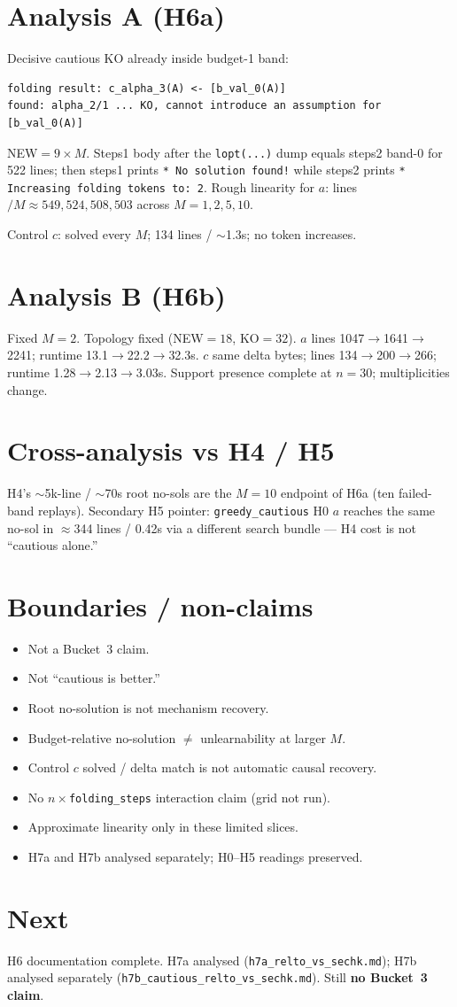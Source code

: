 \documentclass[11pt]{article}
\begin{document}
\section{Analysis A (H6a)}

Decisive cautious KO already inside budget-1 band:
\begin{verbatim}
folding result: c_alpha_3(A) <- [b_val_0(A)]
found: alpha_2/1 ... KO, cannot introduce an assumption for [b_val_0(A)]
\end{verbatim}
NEW${=}9\times M$.
Steps1 body after the \texttt{lopt(...)} dump equals steps2 band-0 for 522
lines; then steps1 prints \texttt{* No solution found!} while steps2 prints
\texttt{* Increasing folding tokens to: 2}.
Rough linearity for $a$: lines$/M\approx 549,524,508,503$ across $M{=}1,2,5,10$.

Control $c$: solved every $M$; 134 lines / $\sim$1.3s; no token increases.

\section{Analysis B (H6b)}

Fixed $M{=}2$. Topology fixed (NEW${=}18$, KO${=}32$).
$a$ lines 1047$\to$1641$\to$2241; runtime 13.1$\to$22.2$\to$32.3s.
$c$ same delta bytes; lines 134$\to$200$\to$266; runtime 1.28$\to$2.13$\to$3.03s.
Support presence complete at $n{=}30$; multiplicities change.

\section{Cross-analysis vs H4 / H5}

H4's $\sim$5k-line / $\sim$70s root no-sols are the $M{=}10$ endpoint of H6a
(ten failed-band replays).
Secondary H5 pointer: \texttt{greedy\_cautious} H0 $a$ reaches the same
no-sol in $\approx$344 lines / 0.42s via a different search bundle --- H4 cost
is not ``cautious alone.''

\section{Boundaries / non-claims}

\begin{itemize}
  \item Not a Bucket~3 claim.
  \item Not ``cautious is better.''
  \item Root no-solution is not mechanism recovery.
  \item Budget-relative no-solution $\neq$ unlearnability at larger $M$.
  \item Control $c$ solved / delta match is not automatic causal recovery.
  \item No $n\times$\texttt{folding\_steps} interaction claim (grid not run).
  \item Approximate linearity only in these limited slices.
  \item H7a and H7b analysed separately; H0--H5 readings preserved.
\end{itemize}

\section{Next}

H6 documentation complete.
H7a analysed (\texttt{h7a\_relto\_vs\_sechk.md}); H7b analysed separately
(\texttt{h7b\_cautious\_relto\_vs\_sechk.md}).
Still \textbf{no Bucket~3 claim}.
\end{document}
